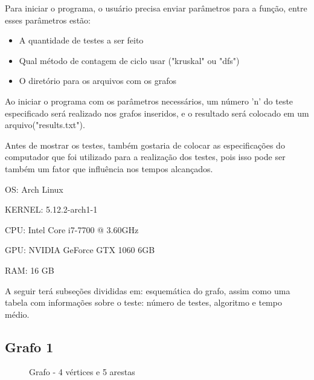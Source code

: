 \documentclass[12pt]{article}
\begin{document}
  Para iniciar o programa, o usuário precisa enviar parâmetros para a função, entre esses parâmetros estão:

  \begin{itemize}
    \item A quantidade de testes a ser feito
    \item Qual método de contagem de ciclo usar ("kruskal" ou "dfs")
    \item O diretório para os arquivos com os grafos
  \end{itemize}

  Ao iniciar o programa com os parâmetros necessários, um número 'n' do teste especificado 
  será realizado nos grafos inseridos, e o resultado será colocado em um arquivo("results.txt").

  Antes de mostrar os testes, também gostaria de colocar as especificações do computador 
  que foi utilizado para a realização dos testes, pois isso pode ser também um fator 
  que influência nos tempos alcançados.

  OS: Arch Linux
  
  KERNEL: 5.12.2-arch1-1
  
  CPU: Intel Core i7-7700 @ 3.60GHz
  
  GPU: NVIDIA GeForce GTX 1060 6GB
  
  RAM: 16 GB
  
  A seguir terá subseções divididas em: esquemática do grafo, assim como 
  uma tabela com informações sobre o teste: número de testes, algoritmo e
  tempo médio.

  \subsection{Grafo 1}

  \begin{figure}[ht]
    \centering
    \caption{Grafo  - 4 vértices e 5 arestas }

  \end{figure}
\end{document}
